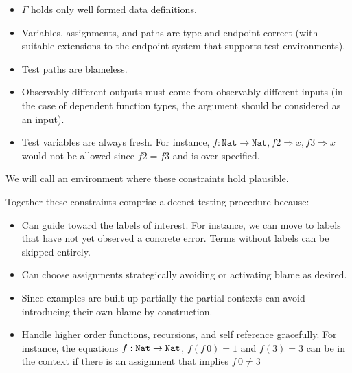  
 
\begin{itemize}
  \item $\Gamma$ holds only well formed data definitions.
  \item Variables, assignments, and paths are type and endpoint correct (with suitable extensions to the endpoint system that supports test environments).
  \item Test paths are blameless.
  \item Observably different outputs must come from observably different inputs (in the case of dependent function types, the argument should be considered as an input).
  \item Test variables are always fresh.
  For instance, $f:\mathtt{Nat}\rightarrow\mathtt{Nat},f2\Rightarrow x,f3\Rightarrow x$ would not be allowed since $f2=f3$ and is over specified.
\end{itemize}
We will call an environment where these constraints hold plausible.

Together these constraints comprise a decnet testing procedure because:
\begin{itemize}
\item Can guide toward the labels of interest.
For instance, we can move to labels that have not yet observed a concrete error.
Terms without labels can be skipped entirely.
\item Can choose assignments strategically avoiding or activating blame as desired.
\item Since examples are built up partially the partial contexts can avoid introducing their own blame by construction.
\item Handle higher order functions, recursions, and self reference gracefully.
For instance, the equations $f: \mathtt{Nat}{} \rightarrow \mathtt{Nat}{}$, $f\left(f\,0\right)=1$ and $f\left(3\right)=3$ can be in the context if there is an assignment that implies $f\,0\neq3$
\end{itemize}
  
  
  
